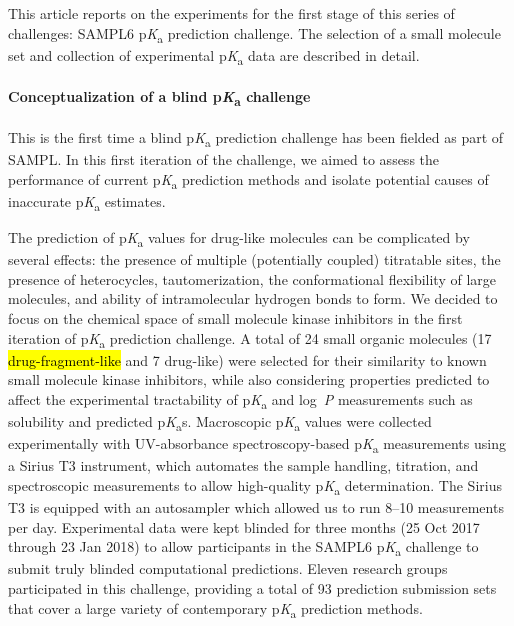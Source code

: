 \documentclass[9pt,lineno]{elife}
\newcommand{\pKa}{p\textit{K}\textsubscript{a}}
\newcommand{\logD}{log~\textit{D}}
\newcommand{\logP}{log~\textit{P}}
\begin{document}
This article reports on the experiments for the first stage of this series of challenges: SAMPL6 \pKa{} prediction challenge. 
The selection of a small molecule set and collection of experimental \pKa{} data are described in detail.

\paragraph{Conceptualization of a blind \pKa{} challenge}

This is the first time a blind \pKa{} prediction challenge has been fielded as part of SAMPL. 
In this first iteration of the challenge, we aimed to assess the performance of current \pKa{} prediction methods and isolate potential causes of inaccurate \pKa{} estimates.

The prediction of \pKa{} values for drug-like molecules can be complicated by several effects: the presence of multiple (potentially coupled) titratable sites, the presence of heterocycles, tautomerization, the conformational flexibility of large molecules, and ability of intramolecular hydrogen bonds to form. 
We decided to focus on the chemical space of small molecule kinase inhibitors in the first iteration of \pKa{} prediction challenge. 
A total of 24 small organic molecules (17 \hl{drug-fragment-like} and 7 drug-like) were selected for their similarity to known small molecule kinase inhibitors, while also considering properties predicted to affect the experimental tractability of \pKa{} and \logP{} measurements such as solubility and predicted \pKa{}s. 
Macroscopic \pKa{} values were collected experimentally with UV-absorbance spectroscopy-based \pKa{} measurements using a Sirius T3 instrument, which automates the sample handling, titration, and spectroscopic measurements to allow high-quality \pKa{} determination. 
The Sirius T3 is equipped with an autosampler which allowed us to run 8--10 measurements per day.
Experimental data were kept blinded for three months (25 Oct 2017 through 23 Jan 2018) to allow participants in the SAMPL6 \pKa{} challenge to submit truly blinded computational predictions. 
Eleven research groups participated in this challenge, providing a total of 93 prediction submission sets that cover a large variety of contemporary \pKa{} prediction methods. 
 
\end{document}
